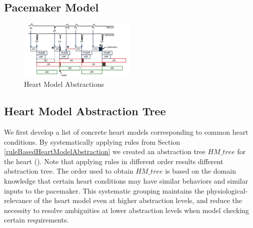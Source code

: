 \subsection{Pacemaker Model}
\begin{figure}[!t]
		\centering
		\includegraphics[width=0.5\textwidth]{figs/PM_timers.pdf}
		\caption{\small Heart Model Abstractions}
		\label{fig:PM_timers}
\end{figure}\subsection{Heart Model Abstraction Tree}
We first develop a list of concrete heart models corresponding to common heart conditions. By systematically applying rules from Section \ref{ruleBasedHeartModelAbstraction} we created an abstraction tree $HM\_tree$ for the heart (). Note that applying rules in different order results different abstraction tree. The order used to obtain $HM\_tree$ is based on the domain knowledge that certain heart conditions may have similar behaviors and similar inputs to the pacemaker. This systematic grouping maintains the physiological-relevance of the heart model even at higher abstraction levels, and reduce the necessity to resolve ambiguities at lower abstraction levels when model checking certain requirements.
